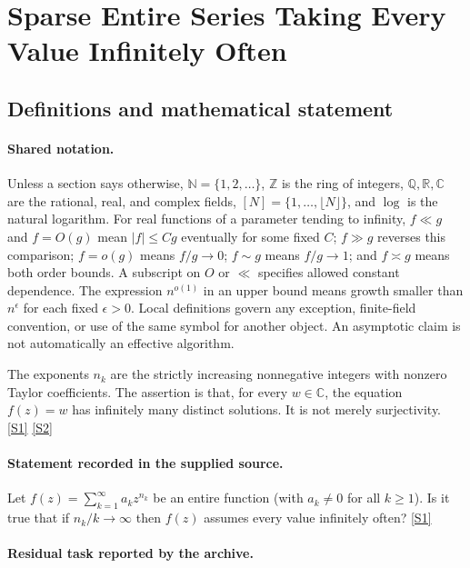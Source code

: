\documentclass[11pt,a4paper]{article}
\newcommand{\N}{\mathbb{N}}
\newcommand{\Z}{\mathbb{Z}}
\newcommand{\Q}{\mathbb{Q}}
\newcommand{\R}{\mathbb{R}}
\newcommand{\C}{\mathbb{C}}
\newcommand{\sref}[2]{\hyperlink{source:#1:#2}{[S#2]}}
\begin{document}
\section{Sparse Entire Series Taking Every Value Infinitely Often}\label{statement}


\subsection{Definitions and mathematical statement}

\paragraph{Shared notation.}Unless a section says otherwise, $\N=\{1,2,\ldots\}$,
$\Z$ is the ring of integers, $\Q,\R,\C$ are the rational, real, and complex
fields, $[N]=\{1,\ldots,\lfloor N\rfloor\}$, and $\log$ is the natural
logarithm. For real functions of a parameter tending to infinity,
$f\ll g$ and $f=O(g)$ mean $|f|\leq Cg$ eventually for some fixed $C$;
$f\gg g$ reverses this comparison; $f=o(g)$ means $f/g\to0$;
$f\sim g$ means $f/g\to1$; and $f\asymp g$ means both order bounds.
A subscript on $O$ or $\ll$ specifies allowed constant dependence.
The expression $n^{o(1)}$ in an upper bound means growth smaller than
$n^\epsilon$ for each fixed $\epsilon>0$. Local definitions govern any
exception, finite-field convention, or use of the same symbol for another
object. An asymptotic claim is not automatically an effective algorithm.



The exponents $n_k$ are the strictly increasing nonnegative integers with nonzero Taylor coefficients. The assertion is that, for every $w\in\C$, the equation $f(z)=w$ has infinitely many distinct solutions. It is not merely surjectivity. \sref{statement}{1} \sref{statement}{2}

\paragraph{Statement recorded in the supplied source.}
Let $f(z)=\sum_{k=1}^\infty a_kz^{n_k}$ be an entire function (with $a_k\neq 0$ for all $k\geq 1$). Is it true that if $n_k/k\to \infty$ then $f(z)$ assumes every value infinitely often? \sref{statement}{1}

\paragraph{Residual task reported by the archive.}
\end{document}
